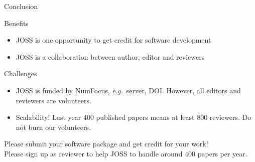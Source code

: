 \documentclass{beamer}
\begin{document}
\begin{frame}{Conclusion}

\begin{block}{Benefits }
    \begin{itemize}
        \item JOSS is one opportunity to get credit for software development
        \item JOSS is a collaboration between author, editor and reviewers
    \end{itemize}
\end{block}

\begin{block}{Challenges }
        \begin{itemize}
            \item  JOSS is funded by NumFocus, \emph{e.g.}\ server, DOI. However, all editors and reviewers are volunteers.
            \item Scalability! Last year 400 published papers means at least 800 reviewers. Do not burn our volunteers.
        \end{itemize}
\end{block}

  Please submit your software package and get credit for your work!\\
  Please sign up as reviewer to help JOSS to handle around 400 papers per year.


\tiny \doclicenseThis
\end{frame}
\end{document}

